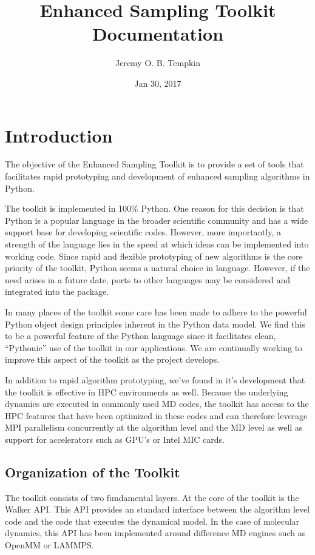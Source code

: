 \documentclass[letterpaper,10pt,english]{sphinxmanual}
\title{Enhanced Sampling Toolkit Documentation}
\date{Jan 30, 2017}
\author{Jeremy O. B. Tempkin}
\begin{document}
\maketitle
\sphinxtableofcontents
{}\label{\detokenize{index::doc}}



\chapter{Introduction}
\label{\detokenize{introduction.doc:introduction}}\label{\detokenize{introduction.doc:welcome-to-enhanced-sampling-toolkit-s-documentation}}\label{\detokenize{introduction.doc::doc}}
The objective of the Enhanced Sampling Toolkit is to provide a set of tools that facilitates rapid prototyping and development of enhanced sampling algorithms in Python.

The toolkit is implemented in 100\% Python. One reason for this decision is that Python is a popular language in the broader scientific community and has a wide support base for developing scientific codes. However, more importantly, a strength of the language lies in the speed at which ideas can be implemented into working code. Since rapid and flexible prototyping of new algorithms is the core priority of the toolkit, Python seems a natural choice in language. However, if the need arises in a future date, ports to other languages may be considered and integrated into the package.

In many places of the toolkit some care has been made to adhere to the powerful Python object design principles inherent in the Python data model. We find this to be a powerful feature of the Python language since it facilitates clean, ``Pythonic'' use of the toolkit in our applications. We are continually working to improve this aspect of the toolkit as the project develops.

In addition to rapid algorithm prototyping, we've found in it's development that the toolkit is effective in HPC environments as well. Because the underlying dynamics are executed in commonly used MD codes, the toolkit has access to the HPC features that have been optimized in these codes and can therefore leverage MPI parallelism concurrently at the algorithm level and the MD level as well as support for accelerators such as GPU's or Intel MIC cards.


\section{Organization of the Toolkit}
\label{\detokenize{introduction.doc:organization-of-the-toolkit}}
The toolkit consists of two fundamental layers. At the core of the toolkit is the Walker API. This API provides an standard interface between the algorithm level code and the code that executes the dynamical model. In the case of molecular dynamics, this API has been implemented around difference MD engines such as OpenMM or LAMMPS.
\end{document}
